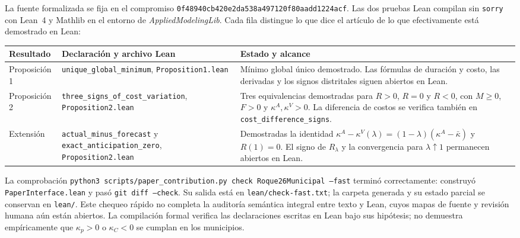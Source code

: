 La fuente formalizada se fija en el compromiso \texttt{0f48940cb420e2da538a497120f80aadd1224acf}. Las dos pruebas Lean compilan sin \texttt{sorry} con Lean~4 y Mathlib en el entorno de \emph{AppliedModelingLib}. Cada fila distingue lo que dice el artículo de lo que efectivamente está demostrado en Lean:
\begin{center}
\small
\begin{tabular}{p{.18\linewidth}p{.35\linewidth}p{.37\linewidth}}
\toprule
Resultado & Declaración y archivo Lean & Estado y alcance \\
\midrule
Proposición 1 & \texttt{unique\_global\_minimum}, \texttt{Proposition1.lean} & Mínimo global único demostrado. Las fórmulas de duración y costo, las derivadas y los signos distritales siguen abiertos en Lean. \\
Proposición 2 & \texttt{three\_signs\_of\_cost\_variation}, \texttt{Proposition2.lean} & Tres equivalencias demostradas para $R>0$, $R=0$ y $R<0$, con $M\geq0$, $F>0$ y $\kappa^A,\kappa^V>0$. La diferencia de costos se verifica también en \texttt{cost\_difference\_signs}. \\
Extensión & \texttt{actual\_minus\_forecast} y \texttt{exact\_anticipation\_zero}, \texttt{Proposition2.lean} & Demostradas la identidad $\kappa^A-\kappa^V(\lambda)=(1-\lambda)(\kappa^A-\bar\kappa)$ y $R(1)=0$. El signo de $R_\lambda$ y la convergencia para $\lambda\uparrow1$ permanecen abiertos en Lean. \\
\bottomrule
\end{tabular}
\end{center}
La comprobación \texttt{python3 scripts/paper\_contribution.py check Roque26Municipal --fast} terminó correctamente: construyó \texttt{PaperInterface.lean} y pasó \texttt{git diff --check}. Su salida está en \texttt{lean/check-fast.txt}; la carpeta generada y su estado parcial se conservan en \texttt{lean/}. Este chequeo rápido no completa la auditoría semántica integral entre texto y Lean, cuyos mapas de fuente y revisión humana aún están abiertos. La compilación formal verifica las declaraciones escritas en Lean bajo sus hipótesis; no demuestra empíricamente que $\kappa_p>0$ o $\kappa_C<0$ se cumplan en los municipios.
